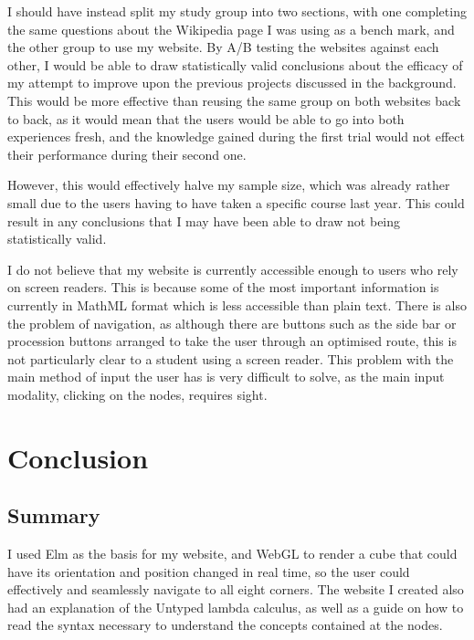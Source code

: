 \documentclass{l4proj}
\begin{document}
I should have instead split my study group into two sections, with one completing the same questions about the Wikipedia page I was using as a bench mark, and the other group to use my website.  By A/B testing the websites against each other, I would be able to draw statistically valid conclusions about the efficacy of my attempt to improve upon the previous projects discussed in the background.  This would be more effective than reusing the same group on both websites back to back, as it would mean that the users would be able to go into both experiences fresh, and the knowledge gained during the first trial would not effect their performance during their second one. 

However, this would effectively halve my sample size, which was already rather small due to the users having to have taken a specific course last year. This could result in any conclusions that I may have been able to draw not being statistically valid.

I do not believe that my website is currently accessible enough to users who rely on screen readers.  This is because some of the most important information is currently in MathML format which is less accessible than plain text.  There is also the problem of navigation, as although there are buttons such as the side bar or procession buttons arranged to take the user through an optimised route, this is not particularly clear to a student using a screen reader.  This problem with the main method of input the user has is very difficult to solve, as the main input modality, clicking on the nodes, requires sight.

\chapter{Conclusion}    

\section{Summary}

I used Elm as the basis for my website, and WebGL to render a cube that could have its orientation and position changed in real time, so the user could effectively and seamlessly navigate to all eight corners. The website I created also had an explanation of the Untyped lambda calculus, as well as a guide on how to read the syntax necessary to understand the concepts contained at the nodes.
\end{document}
